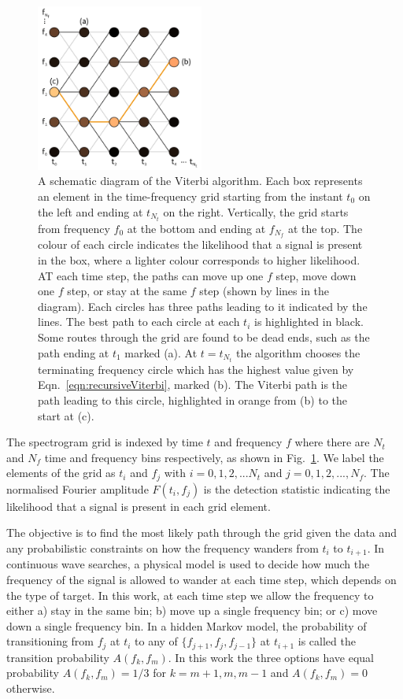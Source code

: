 \documentclass[paper-main.tex]{subfiles}
\begin{document}
\begin{figure}
\includegraphics[width=0.49\textwidth]{figures/viterbiDiagram.pdf}
\caption{\label{fig:viterbi}
A schematic diagram of the Viterbi algorithm. 
Each box represents an element in the time-frequency grid starting from the instant $t_0$ on the left and ending at $t_{N_t}$ on the right. 
Vertically, the grid starts from frequency $f_0$ at the bottom and ending at $f_{N_f}$ at the top. 
The colour of each circle indicates the likelihood that a signal is present in the box, where a lighter colour corresponds to higher likelihood. 
AT each time step, the paths can move up one $f$ step, move down one $f$ step, or stay at the same $f$ step (shown by lines in the diagram). 
Each circles has three paths leading to it indicated by the lines. 
The best path to each circle at each $t_i$ is highlighted in black. 
Some routes through the grid are found to be dead ends, such as the path ending at $t_1$ marked (a). 
At $t=t_{N_t}$ the algorithm chooses the terminating frequency circle which has the highest value given by Eqn.~\ref{eqn:recursiveViterbi}, marked (b). 
The Viterbi path is the path leading to this circle, highlighted in orange from (b) to the start at (c). 
}
\end{figure}


The spectrogram grid is indexed by time $t$ and frequency $f$ where there are $N_t$ and $N_f$ time and frequency bins respectively, as shown in Fig.~\ref{fig:viterbi}.
We label the elements of the grid as $t_i$ and $f_j$ with $i=0,1,2,...N_t$ and $j=0,1,2,...,N_f$. 
The normalised Fourier amplitude $F(t_i,f_j)$ is the detection statistic indicating the likelihood that a signal is present in each grid element. 


The objective is to find the most likely path through the grid given the data and any probabilistic constraints on how the frequency wanders from $t_i$ to $t_{i+1}$. 
In continuous wave searches, a physical model is used to decide how much the frequency of the signal is allowed to wander at each time step, which depends on the type of target. 
In this work, at each time step we allow the frequency to either a) stay in the same bin; b) move up a single frequency bin; or c) move down a single frequency bin. 
In a hidden Markov model, the probability of transitioning from $f_j$ at $t_i$ to any of $\{f_{j+1},f_j,f_{j-1}\}$ at $t_{i+1}$ is called the transition probability $A(f_k,f_m)$. 
In this work the three options have equal probability $A(f_k,f_m)=1/3$ for $k=m+1,m,m-1$ and $A(f_k,f_m)=0$ otherwise.
\end{document}
